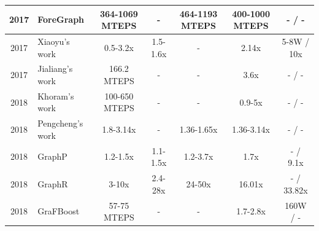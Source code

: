 \documentclass[twoside]{article}
\begin{document}
\begin{multicols}{2}
\begin{table}[]
{\begin{tabular}{|c|l|c|c|c|c|c|}
2017                           & ForeGraph \cite{Dai2017foregraph}                     & 364-1069 MTEPS & -             & 464-1193 MTEPS & 400-1000 MTEPS & - / -                                      \\ \hline
2017                           & Xiaoyu's work \cite{Ma2017fpgahtm}                    & 0.5-3.2x       & 1.5-1.6x      & -              & 2.14x          & 5-8W / 10x                                  \\ \hline
2017                           & Jialiang's work \cite{Zhang2017fpgahmcbfs}            & 166.2 MTEPS    & -             & -              & 3.6x           & - / -                                            \\ \hline
2018                           & Khoram's work \cite{Khoram2018fpgaco-optimizinghmc}   & 100-650 MTEPS  & -             & -              & 0.9-5x         & - / -                                                     \\ \hline
2018                           & Pengcheng's work \cite{yao2018pact}                   & 1.8-3.14x      & -             & 1.36-1.65x     & 1.36-3.14x     & - / -                                      \\ \hline
2018                           & GraphP \cite{zhang2018graphp}                         & 1.2-1.5x       & 1.1-1.5x      & 1.2-3.7x       & 1.7x           & - / 9.1x                                   \\ \hline
2018                           & GraphR \cite{song2018graphr}                          & 3-10x          & 2.4-28x       & 24-50x         & 16.01x         & - / 33.82x                                  \\ \hline
2018                           & GraFBoost \cite{JUN2018GRAFBOOST}                     & 57-75 MTEPS    & -             & -              & 1.7-2.8x       & 160W / -                                    \\ \hline
\end{tabular}%
}
\end{table}


\end{multicols}
\end{document}
